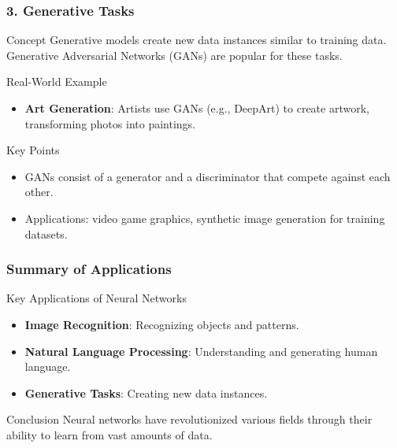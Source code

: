 \documentclass[aspectratio=169]{beamer}
\begin{document}
\begin{frame}
  \frametitle{3. Generative Tasks}

  \begin{block}{Concept}
    Generative models create new data instances similar to training data. Generative Adversarial Networks (GANs) are popular for these tasks.
  \end{block}

  \begin{block}{Real-World Example}
    \begin{itemize}
      \item \textbf{Art Generation}: Artists use GANs (e.g., DeepArt) to create artwork, transforming photos into paintings.
    \end{itemize}
  \end{block}

  \begin{block}{Key Points}
    \begin{itemize}
      \item GANs consist of a generator and a discriminator that compete against each other.
      \item Applications: video game graphics, synthetic image generation for training datasets.
    \end{itemize}
  \end{block}
\end{frame}

\begin{frame}
  \frametitle{Summary of Applications}

  \begin{block}{Key Applications of Neural Networks}
    \begin{itemize}
      \item \textbf{Image Recognition}: Recognizing objects and patterns.
      \item \textbf{Natural Language Processing}: Understanding and generating human language.
      \item \textbf{Generative Tasks}: Creating new data instances.
    \end{itemize}
  \end{block}
  
  \begin{block}{Conclusion}
    Neural networks have revolutionized various fields through their ability to learn from vast amounts of data.
  \end{block}
\end{frame}
\end{document}
